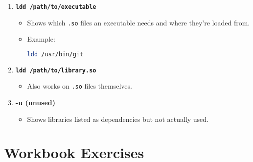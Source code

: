 \documentclass[12pt,a4paper]{report}
\begin{document}
\begin{enumerate}
    \item \textbf{\texttt{ldd /path/to/executable}}
    \begin{itemize}
        \item Shows which \texttt{.so} files an executable needs and where they’re loaded from.
        \item Example:
        \begin{lstlisting}[language=bash]
ldd /usr/bin/git
        \end{lstlisting}
    \end{itemize}

    \item \textbf{\texttt{ldd /path/to/library.so}}
    \begin{itemize}
        \item Also works on \texttt{.so} files themselves.
    \end{itemize}

    \item \textbf{-u (unused)}
    \begin{itemize}
        \item Shows libraries listed as dependencies but not actually used.
    \end{itemize}
\end{enumerate}

\section*{Workbook Exercises}
\end{document}
